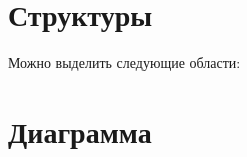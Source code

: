 \documentclass[12pt,a4paper]{article}
\begin{document}
\tableofcontents
\newpage

\section{Структуры}
Можно выделить следующие области:

\newpage
\section{Диаграмма}
\end{document}
